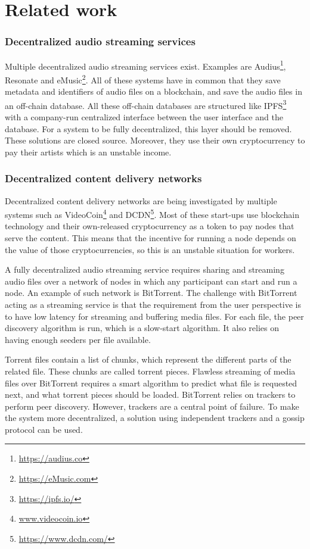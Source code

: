 
\chapter{\label{chap:related-work}Related work}
\subsection{Decentralized audio streaming services}
Multiple decentralized audio streaming services exist. Examples are Audius\footnote{\url{https://audius.co}}, Resonate\cite{lindner2018investing} and eMusic\footnote{\url{https://eMusic.com}}. All of these systems have in common that they save metadata and identifiers of audio files on a blockchain, and save the audio files in an off-chain database. All these off-chain databases are structured like IPFS\footnote{\url{https://ipfs.io/}} with a company-run centralized interface between the user interface and the database. For a system to be fully decentralized, this layer should be removed. These solutions are closed source. Moreover, they use their own cryptocurrency to pay their artists which is an unstable income.

\subsection{Decentralized content delivery networks}
Decentralized content delivery networks are being investigated by multiple systems such as VideoCoin\footnote{\url{www.videocoin.io}} and DCDN\footnote{\url{https://www.dcdn.com/}}. Most of these start-ups use blockchain technology and their own-released cryptocurrency as a token to pay nodes that serve the content. This means that the incentive for running a node depends on the value of those cryptocurrencies, so this is an unstable situation for workers. 

A fully decentralized audio streaming service requires sharing and streaming audio files over a network of nodes in which any participant can start and run a node. An example of such network is BitTorrent. The challenge with BitTorrent acting as a streaming service is that the requirement from the user perspective is to have low latency for streaming and buffering media files. For each file, the peer discovery algorithm is run, which is a slow-start algorithm. It also relies on having enough seeders per file available.

Torrent files contain a list of chunks, which represent the different parts of the related file. These chunks are called torrent pieces. Flawless streaming of media files over BitTorrent requires a smart algorithm to predict what file is requested next, and what torrent pieces should be loaded. BitTorrent relies on trackers to perform peer discovery. However, trackers are a central point of failure. To make the system more decentralized, a solution using independent trackers and a gossip protocol\cite{dan2011efficient} can be used. 

